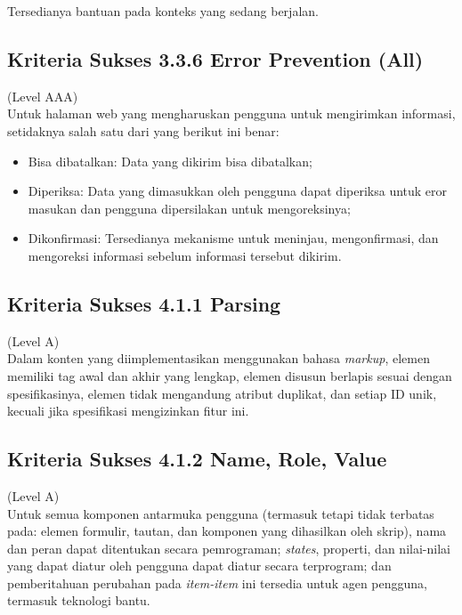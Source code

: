 Tersedianya bantuan pada konteks yang sedang berjalan.


\subsection{Kriteria Sukses 3.3.6 Error Prevention (All)}
\label{subsec:kriteria_3.3.6}
(Level AAA) \\

Untuk halaman web yang mengharuskan pengguna untuk mengirimkan informasi, setidaknya salah satu dari yang berikut ini benar:

\begin{itemize}
	\item Bisa dibatalkan: Data yang dikirim bisa dibatalkan;
	\item Diperiksa: Data yang dimasukkan oleh pengguna dapat diperiksa untuk eror masukan dan pengguna dipersilakan untuk mengoreksinya;
	\item Dikonfirmasi: Tersedianya mekanisme untuk meninjau, mengonfirmasi, dan mengoreksi informasi sebelum informasi tersebut dikirim.
\end{itemize}

\subsection{Kriteria Sukses 4.1.1 Parsing}
\label{subsec:kriteria_4.1.1}
(Level A) \\

Dalam konten yang diimplementasikan menggunakan bahasa \textit{markup}, elemen memiliki tag awal dan akhir yang lengkap, elemen disusun berlapis sesuai dengan spesifikasinya, elemen tidak mengandung atribut duplikat, dan setiap ID unik, kecuali jika spesifikasi mengizinkan fitur ini.

\subsection{Kriteria Sukses 4.1.2 Name, Role, Value}
\label{subsec:kriteria_4.1.2}
(Level A) \\

Untuk semua komponen antarmuka pengguna (termasuk tetapi tidak terbatas pada: elemen formulir, tautan, dan komponen yang dihasilkan oleh skrip), nama dan peran dapat ditentukan secara pemrograman; \textit{states}, properti, dan nilai-nilai yang dapat diatur oleh pengguna dapat diatur secara terprogram; dan pemberitahuan perubahan pada \textit{item-item} ini tersedia untuk agen pengguna, termasuk teknologi bantu.

